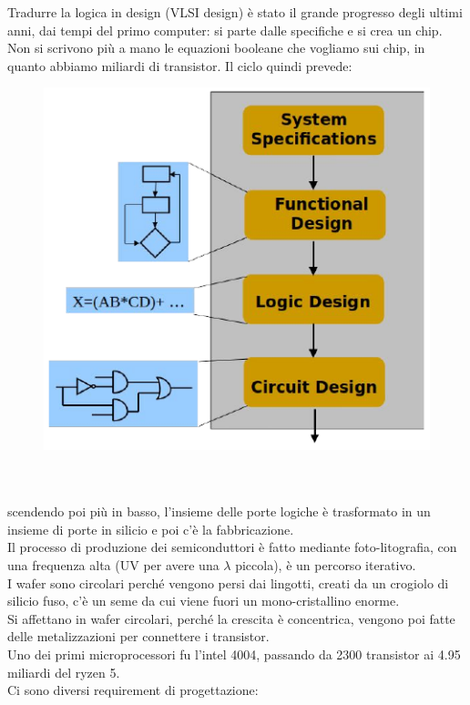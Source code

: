 \documentclass[oneside, 12pt]{extbook}
\begin{document}
Tradurre la logica in design (VLSI design) è stato il grande progresso degli ultimi anni, dai tempi del primo computer: si parte dalle specifiche e si crea un chip. Non si scrivono più a mano le equazioni booleane che vogliamo sui chip, in quanto abbiamo miliardi di transistor. Il ciclo quindi prevede:\\
\begin{figure}[!h]
	\includegraphics[scale=0.5]{immagini/hardware/ciclo_design.png}
\end{figure}
\\\\scendendo poi più in basso, l'insieme delle porte logiche è trasformato in un insieme di porte in silicio e poi c'è la fabbricazione.
\\Il processo di produzione dei semiconduttori è fatto mediante foto-litografia, con una frequenza alta (UV per avere una $\lambda$ piccola), è un percorso iterativo.
\\I wafer sono circolari perché vengono persi dai lingotti, creati da un crogiolo di silicio fuso, c'è un seme da cui viene fuori un mono-cristallino enorme.
\\Si affettano in wafer circolari, perché la crescita è concentrica, vengono poi fatte delle metalizzazioni per connettere i transistor.
\\Uno dei primi microprocessori fu l'intel 4004, passando da 2300 transistor ai 4.95 miliardi del ryzen 5.
\\Ci sono diversi requirement di progettazione:
\end{document}
